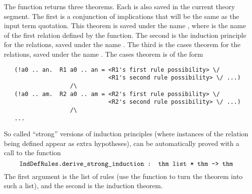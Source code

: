The function returns three theorems.  Each is also saved in the
current theory segment.  The first is a conjunction of implications
that will be the same as the input term quotation.  This theorem is
saved under the name , where  is the name of the
first relation defined by the function.  The second is the induction
principle for the relations, saved under the name .  The
third is the cases theorem for the relations, saved under the name
.  The cases theorem is of the form
\begin{hol}
\begin{verbatim}
   (!a0 .. an.  R1 a0 .. an = <R1's first rule possibility> \/
                              <R1's second rule possibility> \/ ...)
                   /\
   (!a0 .. am.  R2 a0 .. am = <R2's first rule possibility> \/
                              <R2's second rule possibility> \/ ...)
                   /\
   ...
\end{verbatim}
\end{hol}
So called ``strong'' versions of induction principles (where instances
of the relation being defined appear as extra hypotheses), can be
automatically proved with a call to the function 
\[
\ml{IndDefRules.derive\_strong\_induction : thm list * thm -> thm}
\]
The first argument is the list of rules (use the \ml{CONJUNCTS}
function to turn the  theorem into such a list), and
the second is the induction theorem.



